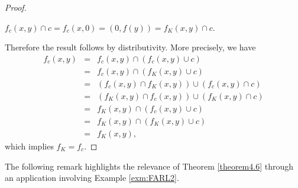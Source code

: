 \documentclass[final,12pt,times]{elsarticle}
\theoremstyle{plain}
\theoremstyle{definition}
\theoremstyle{break}
\begin{document}
\begin{proof}
\begin{center}
$f_c(x,y)\cap c=f_c(x,0)=(0,f(y))=f_K(x,y)\cap c$.
\end{center}
Therefore the result follows by distributivity. More precisely, we have 
\begin{eqnarray*}
              f_c(x,y)&=&f_c(x,y)\cap(f_c(x,y)\cup c)\\&=&f_c(x,y)\cap(f_K(x,y)\cup c)\\&=&(f_c(x,y)\cap f_K(x,y))\cup (f_c(x,y)\cap c)\\&=&(f_K(x,y)\cap f_c(x,y))\cup (f_K(x,y)\cap c)\\&=&f_K(x,y)\cap(f_c(x,y)\cup c)\\&=&f_K(x,y)\cap(f_K(x,y)\cup c)\\&=&f_K(x,y),
               \end{eqnarray*} which implies $f_K=f_c$.
\end{proof}

 The following remark highlights the relevance of Theorem \ref{theorem4.6} through an application involving Example \ref{exm:FARL2}.
\end{document}
